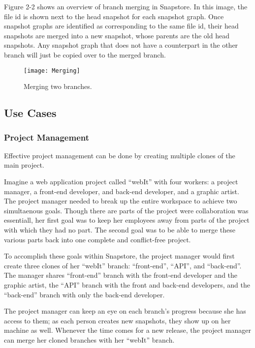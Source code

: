 Figure 2-2 shows an overview of branch merging in Snapstore. In this image, the file id is shown next to the head snapshot for each snapshot graph. Once snapshot graphs are identified as corresponding to the same file id, their head snapshots are merged into a new snapshot, whose parents are the old head snapshots. Any snapshot graph that does not have a counterpart in the other branch will just be copied over to the merged branch.

\begin{figure}
\texttt{[image: Merging]}
\caption{Merging two branches.}
\label{arm:fig1}
\end{figure}

\subsection{Use Cases}

\subsubsection{Project Management}

Effective project management can be done by creating multiple clones of the main project.

Imagine a web application project called ``webIt'' with four workers: a project manager, a front-end developer, and back-end developer, and a graphic artist. The project manager needed to break up the entire workspace to achieve two simultaenous goals. Though there are parts of the project were collaboration was essentiall, her first goal was to keep her employees away from parts of the project with which they had no part. The second goal was to be able to merge these various parts back into one complete and conflict-free project.

To accomplish these goals within Snapstore, the project manager would first create three clones of her ``webIt'' branch: ``front-end'', ``API'', and ``back-end''. The manager shares ``front-end'' branch with the front-end developer and the graphic artist, the ``API'' branch with the front and back-end developers, and the ``back-end'' branch with only the back-end developer. 

The project manager can keep an eye on each branch's progress because she has access to them; as each person creates new snapshots, they show up on her machine as well. Whenever the time comes for a new release, the project manager can merge her cloned branches with her ``webIt'' branch. 

